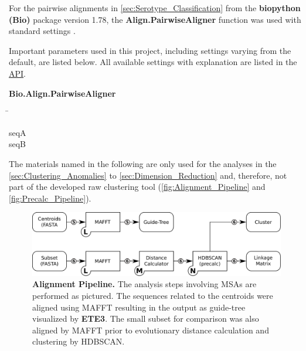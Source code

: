 For the pairwise alignments in \autoref{sec:Serotype_Classification} from the \textbf{biopython (Bio)} package version 1.78, the \textbf{Align.PairwiseAligner} function was used with standard settings \autocite{cock_biopython_2009}. 

Important parameters used in this project, including settings varying from the default, are listed below. All available settings with explanation are listed in the \href{https://biopython.org/docs/1.75/api/Bio.Align.html}{API}.

\begin{leftbar}
    \textbf{Bio.Align.PairwiseAligner}
    \begin{nstabbing}
        \qquad\qquad\qquad\qquad\qquad\quad\=\kill
    
         seqA \\ 
         
         seqB 
        
    \end{nstabbing}
\end{leftbar}

The materials named in the following are only used for the analyses in the \autoref{sec:Clustering_Anomalies} to \autoref{sec:Dimension_Reduction} and, therefore, not part of the developed raw clustering tool (\autoref{fig:Alignment_Pipeline} and \autoref{fig:Precalc_Pipeline}).

\begin{figure}[!hbt]
    \centering
    \includegraphics[width=\textwidth]{Graphics/Alignment.pdf}
    \caption[Alignment Pipeline]{\textbf{Alignment Pipeline.} The analysis steps involving \glspl{MSA} are performed as pictured. The sequences related to the centroids were aligned using MAFFT resulting in the output as guide-tree visualized by \textbf{ETE3}. The small subset for comparison was also aligned by MAFFT prior to evolutionary distance calculation and clustering by \gls{HDBSCAN}.}
    \label{fig:Alignment_Pipeline}
\end{figure}

